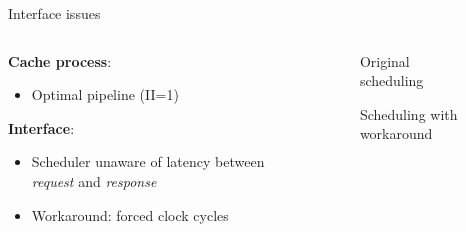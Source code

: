 \documentclass[aspectratio=169]{beamer}
\begin{document}
\begin{frame}{Interface issues}
	\begin{columns}[c]
		\begin{column}{.5\textwidth}
			\textbf{Cache process}:
			\begin{itemize}
				\item Optimal pipeline (II=1)
			\end{itemize}
			
			\bigskip
			\textbf{Interface}:
			\begin{itemize}
				\item Scheduler unaware of latency between
					\emph{request} and \emph{response}
				\item Workaround: forced clock cycles
			\end{itemize}
		\end{column}
		\begin{column}{.5\textwidth}
			\begin{center}
				\begin{figure}
					\caption{Original scheduling}
				\end{figure}
				\begin{figure}
					\caption{Scheduling with workaround}
				\end{figure}
			\end{center}
		\end{column}
	\end{columns}
\end{frame}
\end{document}
